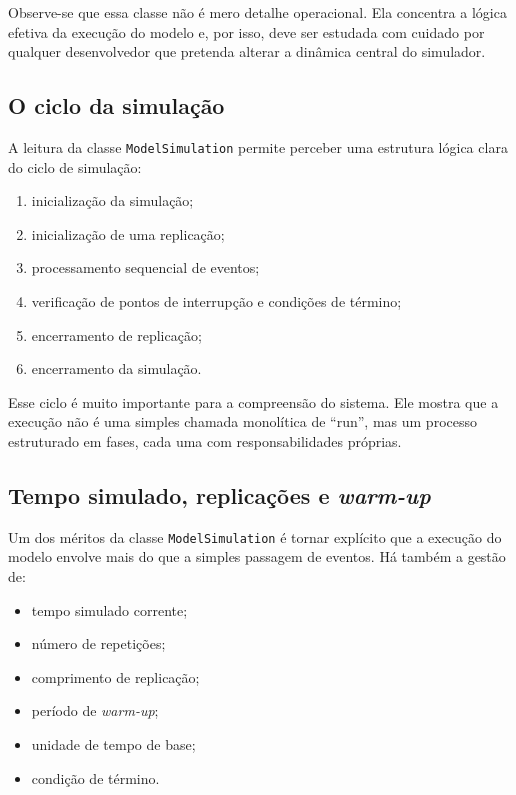 Observe-se que essa classe não é mero detalhe operacional. Ela concentra a lógica efetiva da execução do modelo e, por isso, deve ser estudada com cuidado por qualquer desenvolvedor que pretenda alterar a dinâmica central do simulador.

\subsection{O ciclo da simulação}
\label{subsec:cap7_ciclo_da_simulacao}

A leitura da classe \texttt{ModelSimulation} permite perceber uma estrutura lógica clara do ciclo de simulação:

\begin{enumerate}
    \item inicialização da simulação;
    \item inicialização de uma replicação;
    \item processamento sequencial de eventos;
    \item verificação de pontos de interrupção e condições de término;
    \item encerramento de replicação;
    \item encerramento da simulação.
\end{enumerate}

Esse ciclo é muito importante para a compreensão do sistema. Ele mostra que a execução não é uma simples chamada monolítica de ``run'', mas um processo estruturado em fases, cada uma com responsabilidades próprias.

\subsection{Tempo simulado, replicações e \textit{warm-up}}
\label{subsec:cap7_tempo_replications_warmup}

Um dos méritos da classe \texttt{ModelSimulation} é tornar explícito que a execução do modelo envolve mais do que a simples passagem de eventos. Há também a gestão de:
\begin{itemize}
    \item tempo simulado corrente;
    \item número de repetições;
    \item comprimento de replicação;
    \item período de \textit{warm-up};
    \item unidade de tempo de base;
    \item condição de término.
\end{itemize}

